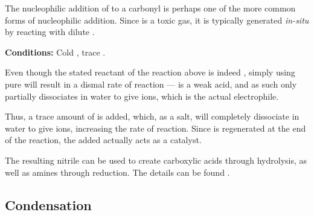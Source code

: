 				The nucleophilic addition of  to a carbonyl is perhaps one of the more common forms of nucleophilic addition.
				Since  is a toxic gas, it is typically generated \textit{in-situ} by reacting  with dilute .


				\vspace{-5mm}


				\vspace{1.5em}
				\vbox{\textbf{Conditions:}	\tabto{35mm}Cold , trace .}


				Even though the stated reactant of the reaction above is indeed , simply using pure  will result in a dismal
				rate of reaction ––  is a weak acid, and as such only partially dissociates in water to give  ions, which is
				the actual electrophile.

				Thus, a trace amount of  is added, which, as a salt, will completely dissociate in water to give  ions,
				increasing the rate of reaction. Since  is regenerated at the end of the reaction, the  added actually
				acts as a catalyst.



				The resulting nitrile can be used to create carboxylic acids through hydrolysis, as well as amines through
				reduction. The details can be found \hyperlink{NitrileUses}{}.



		\subsection{Condensation}

